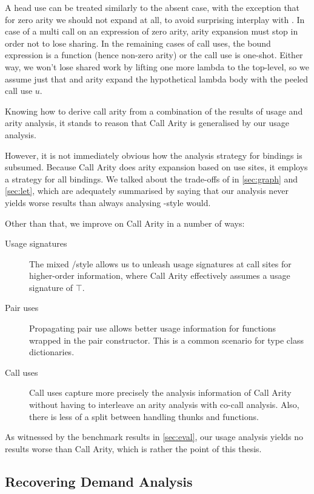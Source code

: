 A head use can be treated similarly to the absent case, with the exception that for zero arity we should not expand at all, to avoid surprising interplay with .
In case of a multi call on an expression of zero arity, arity expansion must stop in order not to lose sharing.
In the remaining cases of call uses, the bound expression is a function (hence non-zero arity) or the call use is one-shot.
Either way, we won't lose shared work by lifting one more lambda to the top-level, so we assume just that and arity expand the hypothetical lambda body with the peeled call use $u$.\medskip

Knowing how to derive call arity from a combination of the results of usage and arity analysis, it stands to reason that Call Arity is generalised by our usage analysis.

However, it is not immediately obvious how the analysis strategy for  bindings is subsumed.
Because Call Arity does arity expansion based on use sites, it employs a  strategy for all bindings.
We talked about the trade-offs of  \vs {} in \cref{sec:graph} and \cref{sec:let}, which are adequately summarised by saying that our analysis never yields worse results than always analysing -style would.

Other than that, we improve on Call Arity in a number of ways:

\begin{description}
  \item[Usage signatures] The mixed / style allows us to unleash usage signatures at call sites for higher-order information, where Call Arity effectively assumes a usage signature of $\top$.
  \item[Pair uses] Propagating pair use allows better usage information for functions wrapped in the pair constructor. This is a common scenario for type class dictionaries.
  \item[Call uses] Call uses capture more precisely the analysis information of Call Arity without having to interleave an arity analysis with co-call analysis. Also, there is less of a split between handling thunks and functions.
\end{description}

As witnessed by the benchmark results in \cref{sec:eval}, our usage analysis yields no results worse than Call Arity, which is rather the point of this thesis.

\subsection{Recovering Demand Analysis}

